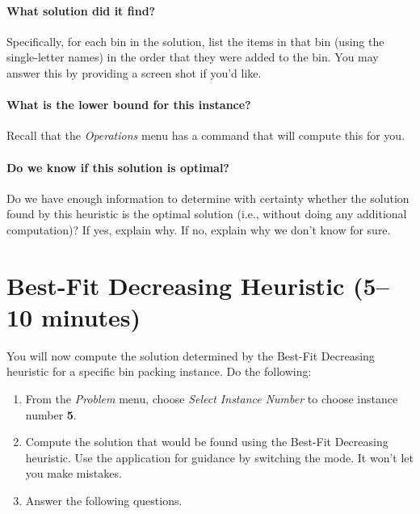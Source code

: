 \documentclass[11pt,letterpaper]{article}
\begin{document}
\paragraph*{What solution did it find?} Specifically, for each bin in the
solution, list the items in that bin (using the single-letter names) in the
order that they were added to the bin. You may answer this by providing a
screen shot if you'd like.

\vspace*{2in}

\paragraph*{What is the lower bound for this instance?} Recall that the
{\em Operations} menu has a command that will compute this for you.

\vspace*{0.25in}

\paragraph*{Do we know if this solution is optimal?} Do we have enough 
information to determine with certainty whether the solution found by
this heuristic is the optimal solution (i.e., without doing any additional
computation)? If yes, explain why. If no, explain why we don't know for sure.

\vspace*{1in}

\newpage

\section{Best-Fit Decreasing Heuristic (5--10 minutes)}\label{sec:bfd}


You will now compute the solution determined by the Best-Fit Decreasing
heuristic for a specific bin packing instance. Do the following:
\begin{enumerate}[leftmargin=*, parsep=0pt, itemsep=2pt, topsep=2pt]
\item From the {\em Problem} menu, choose {\em Select Instance Number}
to choose instance number \textbf{5}.
\item Compute the solution that would be found using the Best-Fit Decreasing
heuristic. Use the application for guidance by switching the mode.
It won't let you make mistakes.
\item Answer the following questions.
\end{enumerate}
\end{document}

